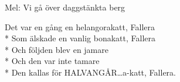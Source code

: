 \begin{SongText}[Helangorakatt]
    \begin{SongInfo}
        Mel: Vi gå över daggstänkta berg
    \end{SongInfo}
    \begin{SongVerse}
        Det var en gång en helangorakatt, Fallera\\*%
        Som älskade en vanlig bonakatt, Fallera\\*%
        Och följden blev en jamare\\*%
        Och den var inte tamare\\*%
        Den kallas för HALVANGÅR…a-katt, Fallera.
    \end{SongVerse}
\end{SongText}
